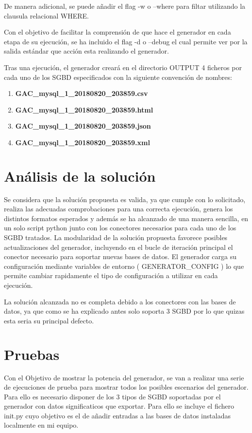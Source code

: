 \documentclass[a4paper,11pt]{book}
\begin{document}
De manera adicional, se puede añadir el flag -w o --where para filtar utilizando la clausula relacional WHERE. 

Con el objetivo de facilitar la comprensión de que hace el generador en cada etapa de su ejecución, se ha incluido el flag -d o --debug el cual permite ver por la salida estándar que acción esta realizando el generador.   

Tras una ejecución, el generador creará en el directorio OUTPUT 4 ficheros por cada uno de los SGBD especificados con la siguiente convención de nombres:

\begin{enumerate}
\item \textbf{GAC\_mysql\_1\_20180820\_203859.csv}
\item \textbf{GAC\_mysql\_1\_20180820\_203859.html}
\item \textbf{GAC\_mysql\_1\_20180820\_203859.json}
\item \textbf{GAC\_mysql\_1\_20180820\_203859.xml}
\end{enumerate}

\section{Análisis de la solución}

	Se considera que la solución propuesta es valida, ya que cumple con lo solicitado, realiza las adecuadas comprobaciones para una correcta ejecución, genera los distintos formatos esperados y además se ha alcanzado de una manera sencilla, en un solo script python junto con los conectores necesarios para cada uno de los SGBD tratados. La modularidad de la solución propuesta favorece posibles actualizaciones del generador, incluyendo en el bucle de iteración principal el conector necesario para soportar nuevas bases de datos. El generador carga su configuración mediante variables de entorno ( GENERATOR\_CONFIG ) lo que permite cambiar rapidamente el tipo de configuración a utilizar en cada ejecución. 

La solución alcanzada no es completa debido a los conectores con las bases de datos, ya que como se ha explicado antes solo soporta 3 SGBD por lo que quizas esta seria su principal defecto. 
 
\section{Pruebas}

Con el Objetivo de mostrar la potencia del generador, se van a realizar una serie de ejecuciones de prueba para mostrar todos los posibles escenarios del generador. Para ello es necesario disponer de los 3 tipos de SGBD soportadas por el generador con datos significaticos que exportar. Para ello se incluye el fichero init.py cuyo objetivo es el de añadir entradas a las bases de datos instaladas localmente en mi equipo. 
\end{document}
